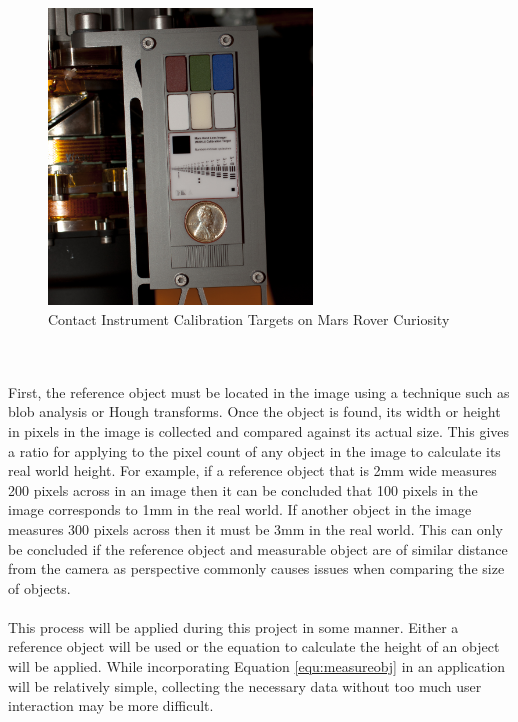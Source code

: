 	\begin{figure}[h!]
		\centering
		\includegraphics[width=7cm]{../images/curiosity_calibration_chart.jpg}
		\caption[Contact Instrument Calibration Targets on Mars Rover Curiosity]{Contact Instrument Calibration Targets on Mars Rover Curiosity \citep{curiosity_image_calibration}}
		\label{fig:curiosity_calibration_chart}
	\end{figure}\\\\
	First, the reference object must be located in the image using a technique such as \gls{blob} analysis or Hough transforms. Once the object is found, its width or height in pixels in the image is collected and compared against its actual size. This gives a ratio for applying to the pixel count of any object in the image to calculate its real world height. For example, if a reference object that is 2mm wide measures 200 pixels across in an image then it can be concluded that 100 pixels in the image corresponds to 1mm in the real world. If another object in the image measures 300 pixels across then it must be 3mm in the real world. This can only be concluded if the reference object and measurable object are of similar distance from the camera as perspective commonly causes issues when comparing the size of objects.
	\\\\
	This process will be applied during this project in some manner. Either a reference object will be used or the equation to calculate the height of an object will be applied. While incorporating Equation \ref{equ:measureobj} in an application will be relatively simple, collecting the necessary data without too much user interaction may be more difficult.
